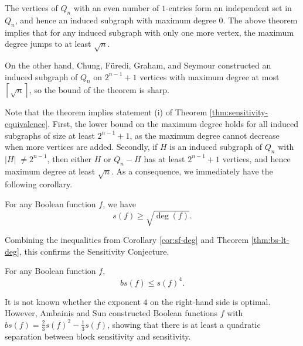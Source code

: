 \begin{remark}
    The vertices of $Q_n$ with an even number of $1$-entries form an independent set in $Q_n$, and hence an induced subgraph with maximum degree $0$.
    The above theorem implies that for any induced subgraph with only one more vertex, the maximum degree jumps to at least $\sqrt{n}$.

    On the other hand, Chung, Füredi, Graham, and Seymour \cite{inducedsubgraphsofthecube} constructed an induced subgraph of $Q_n$ on $2^{n - 1} + 1$ vertices with maximum degree at most $\left \lceil \sqrt{n} \right \rceil$, so the bound of the theorem is sharp.
\end{remark}

Note that the theorem implies statement (i) of Theorem \ref{thm:sensitivity-equivalence}.
First, the lower bound on the maximum degree holds for all induced subgraphs of size at least $2^{n - 1} + 1$, as the maximum degree cannot decrease when more vertices are added.
Secondly, if $H$ is an induced subgraph of $Q_n$ with $|H|\; \ne 2^{n - 1}$, then either $H$ or $Q_n - H$ has at least $2^{n - 1} + 1$ vertices, and hence maximum degree at least $\sqrt{n}$.
As a consequence, we immediately have the following corollary.

\begin{corollary} \label{cor:sf-deg}
    For any Boolean function $f$, we have 
    \begin{equation*}
        s(f) \ge \sqrt{\deg(f)}.
    \end{equation*}
\end{corollary}

Combining the inequalities from Corollary \ref{cor:sf-deg} and Theorem \ref{thm:bs-lt-deg}, this confirms the Sensitivity Conjecture.

\begin{theorem}
    For any Boolean function $f$,
    \begin{equation*}
        bs(f) \le s(f)^4.
    \end{equation*}
\end{theorem}

\begin{remark}
    It is not known whether the exponent $4$ on the right-hand side is optimal. 
    However, Ambainis and Sun \cite{newseparation} constructed Boolean functions $f$ with $bs(f) = \frac{2}{3} s(f)^2 - \frac{1}{3} s(f)$, showing that there is at least a quadratic separation between block sensitivity and sensitivity.
\end{remark}


